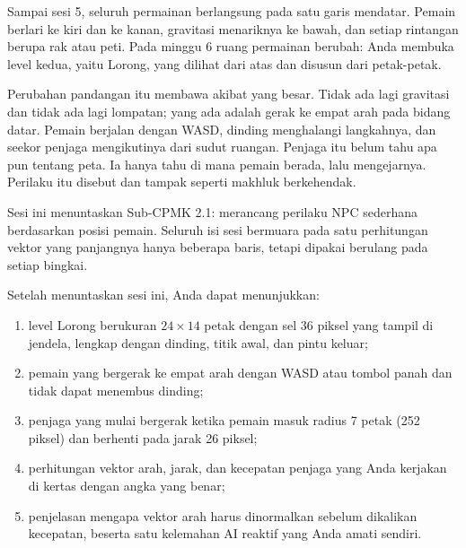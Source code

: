 

Sampai sesi 5, seluruh permainan berlangsung pada satu garis mendatar. Pemain
berlari ke kiri dan ke kanan, gravitasi menariknya ke bawah, dan setiap rintangan
berupa rak atau peti. Pada minggu 6 ruang permainan berubah: Anda membuka level
kedua, yaitu Lorong, yang dilihat dari atas dan disusun dari petak-petak.

Perubahan pandangan itu membawa akibat yang besar. Tidak ada lagi gravitasi dan
tidak ada lagi lompatan; yang ada adalah gerak ke empat arah pada bidang datar.
Pemain berjalan dengan WASD, dinding menghalangi langkahnya, dan seekor penjaga
mengikutinya dari sudut ruangan. Penjaga itu belum tahu apa pun tentang peta.
Ia hanya tahu di mana pemain berada, lalu mengejarnya. Perilaku itu disebut
 dan tampak seperti makhluk berkehendak.

Sesi ini menuntaskan Sub-CPMK 2.1: merancang perilaku NPC sederhana berdasarkan
posisi pemain. Seluruh isi sesi bermuara pada satu perhitungan vektor yang
panjangnya hanya beberapa baris, tetapi dipakai berulang pada setiap bingkai.


\begin{tujuanbox}
Setelah menuntaskan sesi ini, Anda dapat menunjukkan:
\begin{enumerate}[leftmargin=1.5em, itemsep=0.2em]
  \item level Lorong berukuran $24 \times 14$ petak dengan sel 36 piksel yang
        tampil di jendela, lengkap dengan dinding, titik awal, dan pintu keluar;
  \item pemain yang bergerak ke empat arah dengan WASD atau tombol panah dan
        tidak dapat menembus dinding;
  \item penjaga yang mulai bergerak ketika pemain masuk radius 7 petak
        (252 piksel) dan berhenti pada jarak 26 piksel;
  \item perhitungan vektor arah, jarak, dan kecepatan penjaga yang Anda
        kerjakan di kertas dengan angka yang benar;
  \item penjelasan mengapa vektor arah harus dinormalkan sebelum dikalikan
        kecepatan, beserta satu kelemahan AI reaktif yang Anda amati sendiri.
\end{enumerate}
\end{tujuanbox}


